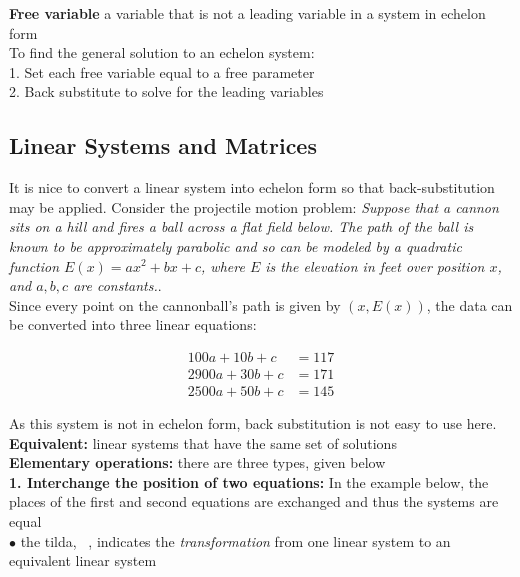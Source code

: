         \textbf{Free variable} a variable that is not a leading variable in a system in echelon form \\

        To find the general solution to an echelon system: \\
        1. Set each free variable equal to a free parameter \\
        2. Back substitute to solve for the leading variables

    \subsection{Linear Systems and Matrices}    %

        It is nice to convert a linear system into echelon form so that back-substitution may be applied. Consider the projectile motion problem: \textit{Suppose that a cannon sits on a hill and fires a ball across a
        flat field below. The path of the ball is known to be approximately parabolic and so can be modeled by a quadratic function $E(x)=ax^2 + bx + c$, where $E$ is the elevation in feet over position $x$, and
        $a,b,c$ are constants.}. \\

        Since every point on the cannonball's path is given by $(x, E(x))$, the data can be converted into three linear equations:

        \begin{align*}
            100a + 10b + c      &= 117 \\
            2900a + 30b + c     &= 171 \\
            2500a + 50b + c     &= 145
        \end{align*}

        As this system is not in echelon form, back substitution is not easy to use here.  \\

        \textbf{Equivalent:} linear systems that have the same set of solutions \\
        \textbf{Elementary operations:} there are three types, given below \\

        \textbf{1. Interchange the position of two equations:} In the example below, the places of the first and second equations are exchanged and thus the systems are equal \\
        $\bullet$ the tilda, ~, indicates the \textit{transformation} from one linear system to an equivalent linear system

